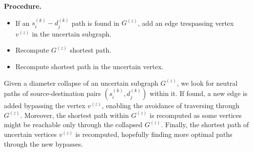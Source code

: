 \textbf{Procedure.}
\begin{itemize}
    \item If an $s_i^{(k)}-d_j^{(k)}$ path is found in $G^{(z)}$, add an edge trespassing vertex $v^{(z)}$ in the uncertain subgraph.
    \item Recompute $G^{(z)}$ shortest path.
    \item Recompute shortest path in the uncertain vertex.
\end{itemize}

Given a diameter collapse of an uncertain subgraph $G^{(z)}$, we look for neutral paths of source-destination pairs $(s_i^{(k)}, d_j^{(k)})$ within it. If found, a new edge is added bypassing the vertex $v^{(z)}$, enabling the avoidance of traversing through $G^{(z)}$. Moreover, the shortest path within $G^{(z)}$ is recomputed as some vertices might be reachable only through the collapsed $G^{(z)}$. Finally, the shortest path of uncertain vertices $v^{(z)}$ is recomputed, hopefully finding more optimal paths through the new bypasses.
